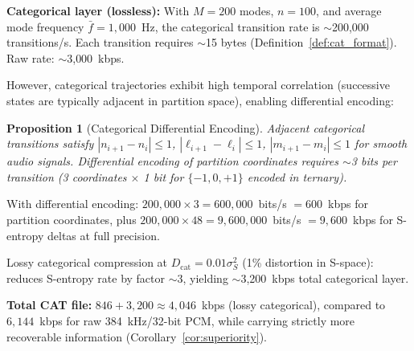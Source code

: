 \documentclass[twocolumn,10pt]{article}
\newtheorem{proposition}[theorem]{Proposition}
\theoremstyle{remark}
\begin{document}
\textbf{Categorical layer (lossless):} With $M = 200$ modes, $n = 100$, and average mode frequency $\bar{f} = 1{,}000$~Hz, the categorical transition rate is $\sim$200{,}000 transitions/s. Each transition requires $\sim$15 bytes (Definition~\ref{def:cat_format}). Raw rate: $\sim$3{,}000~kbps.

However, categorical trajectories exhibit high temporal correlation (successive states are typically adjacent in partition space), enabling differential encoding:

\begin{proposition}[Categorical Differential Encoding]
\label{prop:differential}
Adjacent categorical transitions satisfy $|n_{i+1} - n_i| \leq 1$, $|\ell_{i+1} - \ell_i| \leq 1$, $|m_{i+1} - m_i| \leq 1$ for smooth audio signals. Differential encoding of partition coordinates requires $\sim$3 bits per transition (3 coordinates $\times$ 1 bit for $\{-1, 0, +1\}$ encoded in ternary).
\end{proposition}

With differential encoding: $200{,}000 \times 3 = 600{,}000$~bits/s $= 600$~kbps for partition coordinates, plus $200{,}000 \times 48 = 9{,}600{,}000$~bits/s $= 9{,}600$~kbps for S-entropy deltas at full precision.

Lossy categorical compression at $D_{\mathrm{cat}} = 0.01 \sigma_S^2$ (1\% distortion in S-space): reduces S-entropy rate by factor $\sim$3, yielding $\sim$3{,}200~kbps total categorical layer.

\textbf{Total CAT file:} $846 + 3{,}200 \approx 4{,}046$~kbps (lossy categorical), compared to $6{,}144$~kbps for raw 384~kHz/32-bit PCM, while carrying strictly more recoverable information (Corollary~\ref{cor:superiority}).
\end{document}
